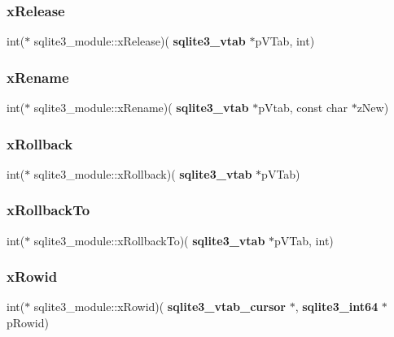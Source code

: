 \subsubsection{xRelease}
{\footnotesize\ttfamily int($\ast$ sqlite3\+\_\+module\+::x\+Release)(\textbf{ sqlite3\+\_\+vtab} $\ast$p\+V\+Tab, int)}

\mbox{\label{structsqlite3__module_af886782e9a1ea5c4b131b2bc373c8092}} 
\subsubsection{xRename}
{\footnotesize\ttfamily int($\ast$ sqlite3\+\_\+module\+::x\+Rename)(\textbf{ sqlite3\+\_\+vtab} $\ast$p\+Vtab, const char $\ast$z\+New)}

\mbox{\label{structsqlite3__module_a3f8676e941a3080557fe10528e04e2f1}} 
\subsubsection{xRollback}
{\footnotesize\ttfamily int($\ast$ sqlite3\+\_\+module\+::x\+Rollback)(\textbf{ sqlite3\+\_\+vtab} $\ast$p\+V\+Tab)}

\mbox{\label{structsqlite3__module_a767753c6c97d1f622e5113367a0547b5}} 
\subsubsection{xRollbackTo}
{\footnotesize\ttfamily int($\ast$ sqlite3\+\_\+module\+::x\+Rollback\+To)(\textbf{ sqlite3\+\_\+vtab} $\ast$p\+V\+Tab, int)}

\mbox{\label{structsqlite3__module_a1e119b28bd3ad706d1982aaa938aac79}} 
\subsubsection{xRowid}
{\footnotesize\ttfamily int($\ast$ sqlite3\+\_\+module\+::x\+Rowid)(\textbf{ sqlite3\+\_\+vtab\+\_\+cursor} $\ast$, \textbf{ sqlite3\+\_\+int64} $\ast$p\+Rowid)}

\mbox{\label{structsqlite3__module_af90f1df803fce1b90048864aeeeee890}} 
